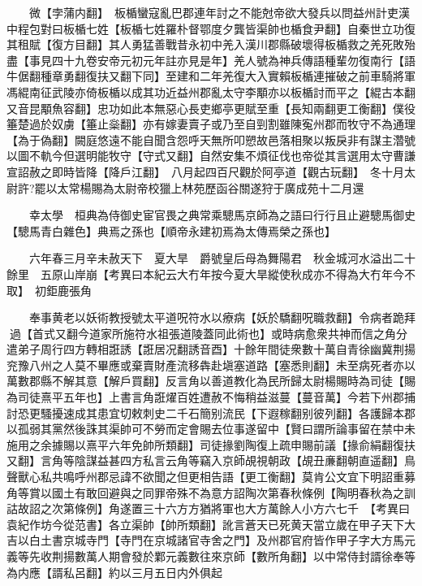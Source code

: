　　微【孛蒲内翻】　板楯蠻寇亂巴郡連年討之不能尅帝欲大發兵以問益州計吏漢中程包對曰板楯七姓【板楯七姓羅朴督鄂度夕龔皆渠帥也楯食尹翻】自秦世立功復其租賦【復方目翻】其人勇猛善戰昔永初中羌入漢川郡縣破壞得板楯救之羌死敗殆盡【事見四十九卷安帝元初元年註亦見是年】羌人號為神兵傳語種輩勿復南行【語牛倨翻種章勇翻復扶又翻下同】至建和二年羌復大入實賴板楯連摧破之前車騎將軍馮緄南征武陵亦倚板楯以成其功近益州郡亂太守李顒亦以板楯討而平之【緄古本翻又音昆顒魚容翻】忠功如此本無惡心長吏鄉亭更賦至重【長知兩翻更工衡翻】僕役箠楚過於奴虜【箠止橤翻】亦有嫁妻賣子或乃至自剄割雖陳寃州郡而牧守不為通理【為于偽翻】闕庭悠遠不能自聞含怨呼天無所叩愬故邑落相聚以叛戾非有謀主濳號以圖不軌今但選明能牧守【守式又翻】自然安集不煩征伐也帝從其言選用太守曹謙宣詔赦之即時皆降【降戶江翻】　八月起四百尺觀於阿亭道【觀古玩翻】　冬十月太尉許?罷以太常楊賜為太尉帝校獵上林苑歷函谷關遂狩于廣成苑十二月還

　　幸太學　桓典為侍御史宦官畏之典常乘驄馬京師為之語曰行行且止避驄馬御史【驄馬青白雜色】典焉之孫也【順帝永建初焉為太傳焉榮之孫也】

　　六年春三月辛未赦天下　夏大旱　爵號皇后母為舞陽君　秋金城河水溢出二十餘里　五原山岸崩【考異曰本紀云大冇年按今夏大旱縱使秋成亦不得為大冇年今不取】　初鉅鹿張角

　　奉事黄老以妖術教授號太平道呪符水以療病【妖於驕翻呪職救翻】令病者跪拜過【首式又翻今道家所施符水祖張道陵蓋同此術也】或時病愈衆共神而信之角分遣弟子周行四方轉相誑誘【誑居况翻誘音酉】十餘年間徒衆數十萬自青徐幽冀荆揚兖豫八州之人莫不畢應或棄賣財產流移犇赴塡塞道路【塞悉則翻】未至病死者亦以萬數郡縣不解其意【解戶買翻】反言角以善道教化為民所歸太尉楊賜時為司徒【賜為司徒熹平五年也】上書言角誑燿百姓遭赦不悔稍益滋蔓【蔓音萬】今若下州郡捕討恐更騷擾速成其患宜切敕刺史二千石簡别流民【下遐稼翻别彼列翻】各護歸本郡以孤弱其黨然後誅其渠帥可不勞而定會賜去位事遂留中【賢曰謂所論事留在禁中未施用之余據賜以熹平六年免帥所類翻】司徒掾劉陶復上疏申賜前議【掾俞絹翻復扶又翻】言角等陰謀益甚四方私言云角等竊入京師覘視朝政【覘丑亷翻朝直遥翻】鳥聲獸心私共鳴呼州郡忌諱不欲聞之但更相告語【更工衡翻】莫肯公文宜下明詔重募角等賞以國土有敢回避與之同罪帝殊不為意方詔陶次第春秋條例【陶明春秋為之訓詁故詔之次第條例】角遂置三十六方方猶將軍也大方萬餘人小方六七千　【考異曰袁紀作坊今從范書】各立渠帥【帥所類翻】訛言蒼天已死黄天當立歲在甲子天下大吉以白土書京城寺門【寺門在京城諸官寺舍之門】及州郡官府皆作甲子字大方馬元義等先收荆揚數萬人期會發於鄴元義數往來京師【數所角翻】以中常侍封諝徐奉等為内應【諝私呂翻】約以三月五日内外俱起

